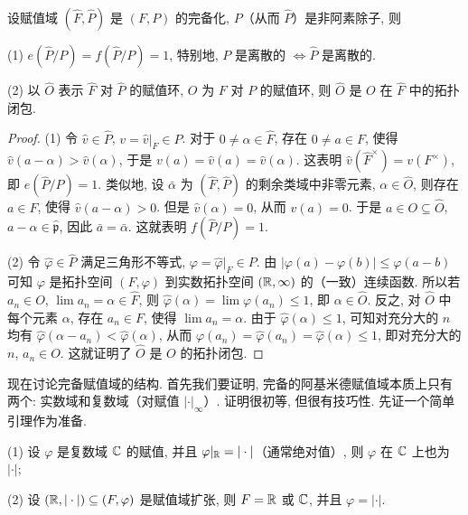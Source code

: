 \begin{theorem}\label{thm:8.2}
设赋值域 $(\widehat{F},\widehat{P})$ 是 $(F,P)$ 的完备化, $P$（从而 $\widehat{P}$）是非阿素除子, 则

(1) $e(\widehat{P}/P)=f(\widehat{P}/P)=1$, 特别地, $P$ 是离散的 $\Leftrightarrow\widehat{P}$ 是离散的.

(2) 以 $\widehat{O}$ 表示 $\widehat{F}$ 对 $\widehat{P}$ 的赋值环, $O$ 为 $F$ 对 $P$ 的赋值环, 则 $\widehat{O}$ 是 $O$ 在 $\widehat{F}$ 中的拓扑闭包.
\end{theorem}

\begin{proof}
(1) 令 $\hat{v}\in\widehat{P}$, $v=\hat{v}|_F\in P$. 对于 $0\neq\alpha\in\widehat{F}$, 存在 $0\neq a\in F$, 使得 $\hat{v}(a-\alpha)>\hat{v}(\alpha)$, 于是 $v(a)=\hat{v}(a)=\hat{v}(\alpha)$. 这表明 $\hat{v}(\widehat{F}^{\times})=v(F^{\times})$, 即 $e(\widehat{P}/P)=1$. 类似地, 设 $\bar{\alpha}$ 为 $(\widehat{F},\widehat{P})$ 的剩余类域中非零元素, $\alpha\in\widehat{O}$, 则存在 $a\in F$, 使得 $\hat{v}(a-\alpha)>0$. 但是 $\hat{v}(\alpha)=0$, 从而 $v(a)=0$. 于是 $a\in O\subseteq\widehat{O}$, $a-\alpha\in\widehat{\mathfrak{p}}$, 因此 $\bar{a}=\bar{\alpha}$. 这就表明 $f(\widehat{P}/P)=1$.

(2) 令 $\hat{\varphi}\in\widehat{P}$ 满足三角形不等式, $\varphi=\hat{\varphi}|_F\in P$. 由 $|\varphi(a)-\varphi(b)|\leqslant\varphi(a-b)$ 可知 $\varphi$ 是拓扑空间 $(F,\varphi)$ 到实数拓扑空间 $(\mathbb{R},\infty)$ 的（一致）连续函数. 所以若 $a_n\in O$, $\lim a_n=\alpha\in\widehat{F}$, 则 $\hat{\varphi}(\alpha)=\lim\varphi(a_n)\leqslant 1$, 即 $\alpha\in\widehat{O}$. 反之, 对 $\widehat{O}$ 中每个元素 $\alpha$, 存在 $a_n\in F$, 使得 $\lim a_n=\alpha$. 由于 $\hat{\varphi}(\alpha)\leqslant 1$, 可知对充分大的 $n$ 均有 $\hat{\varphi}(\alpha-a_n)<\hat{\varphi}(\alpha)$, 从而 $\varphi(a_n)=\hat{\varphi}(a_n)=\hat{\varphi}(\alpha)\leqslant 1$, 即对充分大的 $n$, $a_n\in O$. 这就证明了 $\widehat{O}$ 是 $O$ 的拓扑闭包.
\end{proof}

现在讨论完备赋值域的结构. 首先我们要证明, 完备的阿基米德赋值域本质上只有两个: 实数域和复数域（对赋值 $|\cdot|_{\infty}$）. 证明很初等, 但很有技巧性. 先证一个简单引理作为准备.

\begin{lemma}\label{lem:ch8-1}
(1) 设 $\varphi$ 是复数域 $\mathbb{C}$ 的赋值, 并且 $\varphi|_{\mathbb{R}}=|\cdot|$（通常绝对值）, 则 $\varphi$ 在 $\mathbb{C}$ 上也为 $|\cdot|$;

(2) 设 $(\mathbb{R},|\cdot|)\subseteq(F,\varphi)$ 是赋值域扩张, 则 $F=\mathbb{R}$ 或 $\mathbb{C}$, 并且 $\varphi=|\cdot|$.
\end{lemma}

